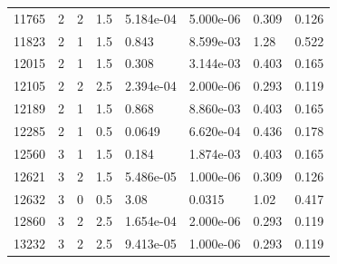 \documentclass[preview]{standalone}
\begin{document}
{{{\begin{tabular}{L{1.2cm}C{1.2cm} C{0.3cm}C{0.5cm} C{1.4cm}C{1.4cm} C{1.4cm}C{1.4cm}}
  11765  &     2  & 2     & 1.5 &  5.184e-04  & 5.000e-06  & 0.309 &  0.126   \\ 
  11823  &     2  & 1     & 1.5 &  0.843  & 8.599e-03  & 1.28 &  0.522   \\ 
  12015  &     2  & 1     & 1.5 &  0.308  & 3.144e-03  & 0.403 &  0.165   \\ 
  12105  &     2  & 2     & 2.5 &  2.394e-04  & 2.000e-06  & 0.293 &  0.119   \\ 
  12189  &     2  & 1     & 1.5 &  0.868  & 8.860e-03  & 0.403 &  0.165   \\ 
  12285  &     2  & 1     & 0.5 &  0.0649  & 6.620e-04  & 0.436 &  0.178   \\ 
  12560  &     3  & 1     & 1.5 &  0.184  & 1.874e-03  & 0.403 &  0.165   \\ 
  12621  &     3  & 2     & 1.5 &  5.486e-05  & 1.000e-06  & 0.309 &  0.126   \\ 
  12632  &     3  & 0     & 0.5 &  3.08  & 0.0315  & 1.02 &  0.417   \\ 
  12860  &     3  & 2     & 2.5 &  1.654e-04  & 2.000e-06  & 0.293 &  0.119   \\ 
  13232  &     3  & 2     & 2.5 &  9.413e-05  & 1.000e-06  & 0.293 &  0.119   \\ 
\hline 
\end{tabular} 

}}}
\end{document}

